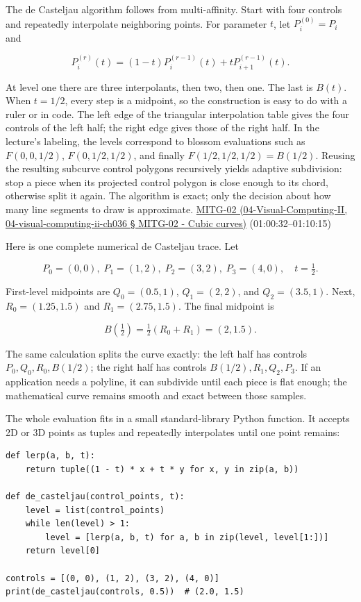 The de Casteljau algorithm follows from multi-affinity. Start with four controls and repeatedly interpolate neighboring points. For parameter \(t\), let \(P_i^{(0)}=P_i\) and

\[
P_i^{(r)}(t)=(1-t)P_i^{(r-1)}(t)+tP_{i+1}^{(r-1)}(t).
\]

At level one there are three interpolants, then two, then one. The last is \(B(t)\). When \(t=1/2\), every step is a midpoint, so the construction is easy to do with a ruler or in code. The left edge of the triangular interpolation table gives the four controls of the left half; the right edge gives those of the right half. In the lecture's labeling, the levels correspond to blossom evaluations such as \(F(0,0,1/2)\), \(F(0,1/2,1/2)\), and finally \(F(1/2,1/2,1/2)=B(1/2)\). Reusing the resulting subcurve control polygons recursively yields adaptive subdivision: stop a piece when its projected control polygon is close enough to its chord, otherwise split it again. The algorithm is exact; only the decision about how many line segments to draw is approximate. \href{}{MITG-02 (04-Visual-Computing-II, 04-visual-computing-ii-ch036 § MITG-02 - Cubic curves)} (01:00:32--01:10:15)

Here is one complete numerical de Casteljau trace. Let

\[
P_0=(0,0),\; P_1=(1,2),\; P_2=(3,2),\; P_3=(4,0),\quad t=\tfrac12.
\]

First-level midpoints are \(Q_0=(0.5,1)\), \(Q_1=(2,2)\), and \(Q_2=(3.5,1)\). Next, \(R_0=(1.25,1.5)\) and \(R_1=(2.75,1.5)\). The final midpoint is

\[
B(\tfrac12)=\tfrac12(R_0+R_1)=(2,1.5).
\]

The same calculation splits the curve exactly: the left half has controls \(P_0,Q_0,R_0,B(1/2)\); the right half has controls \(B(1/2),R_1,Q_2,P_3\). If an application needs a polyline, it can subdivide until each piece is flat enough; the mathematical curve remains smooth and exact between those samples.

The whole evaluation fits in a small standard-library Python function. It accepts 2D or 3D points as tuples and repeatedly interpolates until one point remains:

\begin{verbatim}
def lerp(a, b, t):
    return tuple((1 - t) * x + t * y for x, y in zip(a, b))

def de_casteljau(control_points, t):
    level = list(control_points)
    while len(level) > 1:
        level = [lerp(a, b, t) for a, b in zip(level, level[1:])]
    return level[0]

controls = [(0, 0), (1, 2), (3, 2), (4, 0)]
print(de_casteljau(controls, 0.5))  # (2.0, 1.5)
\end{verbatim}

